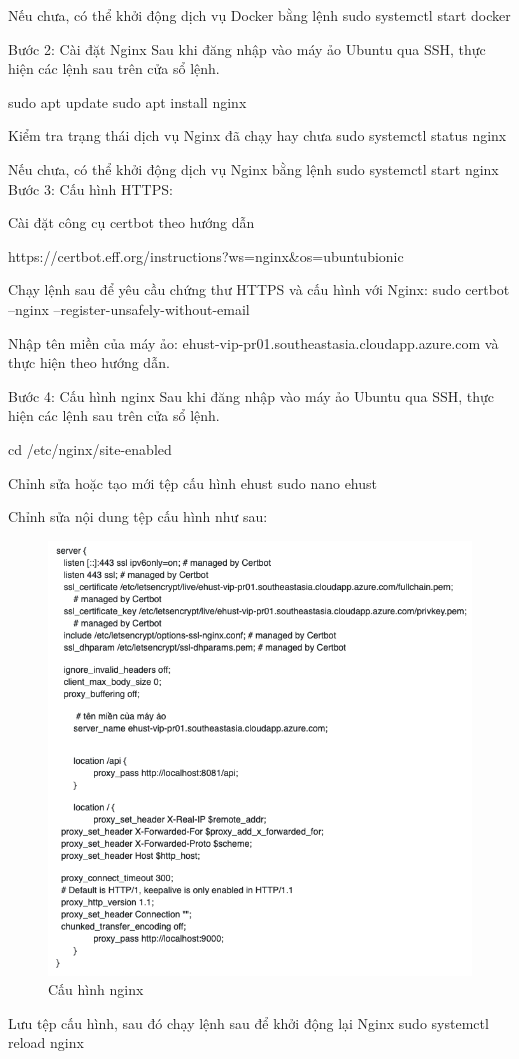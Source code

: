 \documentclass[../Main.tex]{subfiles}
\begin{document}
Nếu chưa, có thể khởi động dịch vụ Docker bằng lệnh
sudo systemctl start docker


Bước 2: Cài đặt Nginx
Sau khi đăng nhập vào máy ảo Ubuntu qua SSH, thực hiện các lệnh sau trên cửa sổ lệnh.

sudo apt update
sudo apt install nginx

Kiểm tra trạng thái dịch vụ Nginx đã chạy hay chưa
sudo systemctl status nginx

Nếu chưa, có thể khởi động dịch vụ Nginx bằng lệnh
sudo systemctl start nginx
Bước 3: Cấu hình HTTPS: 

Cài đặt công cụ certbot theo hướng dẫn

https://certbot.eff.org/instructions?ws=nginx\&os=ubuntubionic

Chạy lệnh sau để yêu cầu chứng thư HTTPS và cấu hình với Nginx:
sudo certbot --nginx --register-unsafely-without-email

Nhập tên miền của máy ảo: ehust-vip-pr01.southeastasia.cloudapp.azure.com
	và thực hiện theo hướng dẫn.

Bước 4: Cấu hình nginx
Sau khi đăng nhập vào máy ảo Ubuntu qua SSH, thực hiện các lệnh sau trên cửa sổ lệnh.
		
		cd /etc/nginx/site-enabled

		Chỉnh sửa hoặc tạo mới tệp cấu hình ehust
		sudo nano ehust

		Chỉnh sửa nội dung tệp cấu hình như sau:
\begin{figure}[H]
   \centering
    \includegraphics[width=0.85\linewidth]{Figure/cau_hinh_nginx.png}
    \caption{Cấu hình nginx}
    \label{fig:cau_hinh_nginx}
\end{figure}
Lưu tệp cấu hình, sau đó chạy lệnh sau để khởi động lại Nginx
	sudo systemctl reload nginx
 
\end{document}
